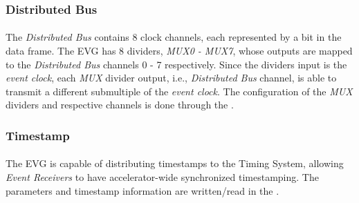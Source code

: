 \documentclass[openany]{article}
\begin{document}
			\FloatBarrier
 
		\subsubsection{Distributed Bus}\label{sec:evg-distributed-bus}

			\paragraph{} The \emph{Distributed Bus} contains 8 clock channels, each represented by a bit in the data frame. The EVG has 8 dividers, \emph{MUX0 - MUX7}, whose outputs are mapped to the \emph{Distributed Bus} channels 0 - 7 respectively. Since the dividers input is the \emph{event clock}, each \emph{MUX} divider output, i.e., \emph{Distributed Bus} channel, is able to transmit a different submultiple of the \emph{event clock}. The configuration of the \emph{MUX} dividers and respective channels is done through the .

		\subsubsection{Timestamp}\label{sec:evg-timestamp}

			\paragraph{} The EVG is capable of distributing timestamps to the Timing System, allowing \emph{Event Receivers} to have accelerator-wide synchronized timestamping. The parameters and timestamp information are written/read in the \emph{}.
\end{document}
